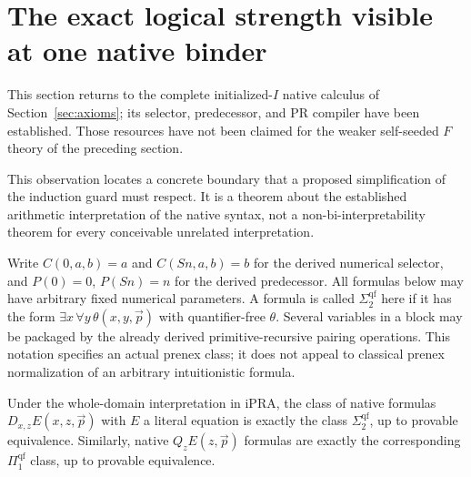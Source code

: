 \section{The exact logical strength visible at one native binder}
\label{sec:depth-one-boundary}

This section returns to the complete initialized-$I$ native calculus of
Section~\ref{sec:axioms}; its selector, predecessor, and PR compiler have
been established. Those resources have not been claimed for the weaker
self-seeded $F$ theory of the preceding section.

This observation locates a concrete boundary that a proposed simplification
of the induction guard must respect. It is a theorem about the established
arithmetic interpretation of the native syntax, not a non-bi-interpretability
theorem for every conceivable unrelated interpretation.

Write $C(0,a,b)=a$ and $C(Sn,a,b)=b$ for the derived numerical selector,
and $P(0)=0$, $P(Sn)=n$ for the derived predecessor. All formulas below may
have arbitrary fixed numerical parameters. A formula is called
$\Sigma_2^{\mathrm{qf}}$ here if it has the form
$\exists x\,\forall y\,\theta(x,y,\vec p)$ with quantifier-free $\theta$.
Several variables in a block may be packaged by the already derived
primitive-recursive pairing operations. This notation specifies an actual
prenex class; it does not appeal to classical prenex normalization of an
arbitrary intuitionistic formula.

\begin{proposition}
Under the whole-domain interpretation in iPRA, the class of native formulas
$D_{x,z}E(x,z,\vec p)$ with $E$ a literal equation is exactly the class
$\Sigma_2^{\mathrm{qf}}$, up to provable equivalence. Similarly, native
$Q_zE(z,\vec p)$ formulas are exactly the corresponding
$\Pi_1^{\mathrm{qf}}$ class, up to provable equivalence.
\end{proposition}

